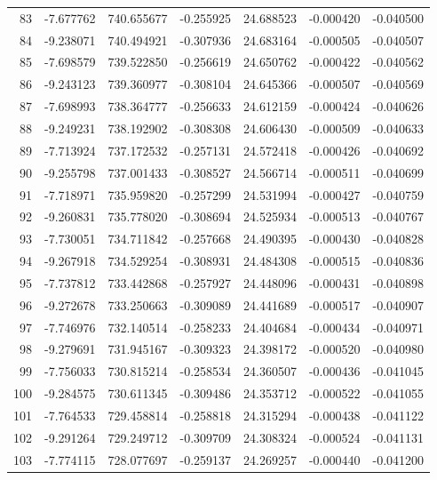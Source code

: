 \begin{tabular}{rrrrrrr}
  83 &  -7.677762 &  740.655677 & -0.255925 &   24.688523 &   -0.000420 & -0.040500 \\
  84 &  -9.238071 &  740.494921 & -0.307936 &   24.683164 &   -0.000505 & -0.040507 \\
  85 &  -7.698579 &  739.522850 & -0.256619 &   24.650762 &   -0.000422 & -0.040562 \\
  86 &  -9.243123 &  739.360977 & -0.308104 &   24.645366 &   -0.000507 & -0.040569 \\
  87 &  -7.698993 &  738.364777 & -0.256633 &   24.612159 &   -0.000424 & -0.040626 \\
  88 &  -9.249231 &  738.192902 & -0.308308 &   24.606430 &   -0.000509 & -0.040633 \\
  89 &  -7.713924 &  737.172532 & -0.257131 &   24.572418 &   -0.000426 & -0.040692 \\
  90 &  -9.255798 &  737.001433 & -0.308527 &   24.566714 &   -0.000511 & -0.040699 \\
  91 &  -7.718971 &  735.959820 & -0.257299 &   24.531994 &   -0.000427 & -0.040759 \\
  92 &  -9.260831 &  735.778020 & -0.308694 &   24.525934 &   -0.000513 & -0.040767 \\
  93 &  -7.730051 &  734.711842 & -0.257668 &   24.490395 &   -0.000430 & -0.040828 \\
  94 &  -9.267918 &  734.529254 & -0.308931 &   24.484308 &   -0.000515 & -0.040836 \\
  95 &  -7.737812 &  733.442868 & -0.257927 &   24.448096 &   -0.000431 & -0.040898 \\
  96 &  -9.272678 &  733.250663 & -0.309089 &   24.441689 &   -0.000517 & -0.040907 \\
  97 &  -7.746976 &  732.140514 & -0.258233 &   24.404684 &   -0.000434 & -0.040971 \\
  98 &  -9.279691 &  731.945167 & -0.309323 &   24.398172 &   -0.000520 & -0.040980 \\
  99 &  -7.756033 &  730.815214 & -0.258534 &   24.360507 &   -0.000436 & -0.041045 \\
 100 &  -9.284575 &  730.611345 & -0.309486 &   24.353712 &   -0.000522 & -0.041055 \\
 101 &  -7.764533 &  729.458814 & -0.258818 &   24.315294 &   -0.000438 & -0.041122 \\
 102 &  -9.291264 &  729.249712 & -0.309709 &   24.308324 &   -0.000524 & -0.041131 \\
 103 &  -7.774115 &  728.077697 & -0.259137 &   24.269257 &   -0.000440 & -0.041200 \\

\end{tabular}
